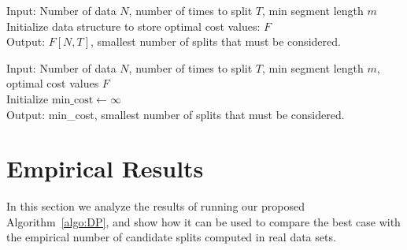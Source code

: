 \documentclass[algorithms,article,accept,oneauthor]{Definitions/mdpi}
\begin{document}
\begin{algorithm2e}[H]
\SetAlgoLined
 \caption{{Computing}  the best case number of splits in binary segmentation.}\label{algo:DP}
Input: Number of data $N$, number of times to split $T$, min segment length $m$\\
Initialize data structure to store optimal cost values: $F$\\
Output: $F[N,T]$, smallest number of splits that must be considered.
\end{algorithm2e}
\vspace{12pt}
\begin{algorithm2e}[H]
\SetAlgoLined
 \caption{{getMin}  sub-routine.}\label{algo:getMin}
Input: Number of data $N$, number of times to split $T$, min segment length $m$, optimal cost values $F$\\
Initialize $\text{min\_cost}\gets \infty$\\
Output: min\_cost, smallest number of splits that must be considered.
\end{algorithm2e}




\section{Empirical Results}
\label{sec:results}

In this section we analyze the results of running our proposed Algorithm~\ref{algo:DP}, and show how it can be used to compare the best case with the empirical number of candidate splits computed in real data sets.
\end{document}
